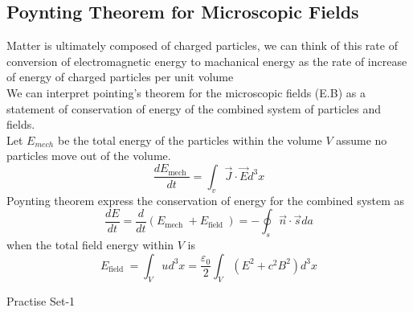 \subsection{Poynting Theorem for Microscopic Fields}
Matter is ultimately composed of charged particles, we can think of this rate of conversion of electromagnetic energy to machanical energy as the rate of increase of energy of charged particles per unit volume\\
We can interpret pointing's theorem for the microscopic fields (E.B) as a statement of conservation of energy of the combined system of particles and fields.\\
Let $E_{mech}$ be the total energy of the particles within the volume $V$ assume no particles move out of the volume.
$$\frac{d E_{\text {mech }}}{d t}=\int_{v} \vec{J} \cdot \vec{E} d^{3} x$$
Poynting theorem express the conservation of energy for the combined system as
$$\frac{d E}{d t}=\frac{d}{d t}\left(E_{\text {mech }}+E_{\text {field }}\right)=-\oint_{s} \vec{n} \cdot \vec{s} d a$$
when the total field energy within $V$ is
$$E_{\text {field } }=\int_{V} u d^{3} x=\frac{\varepsilon_{0}}{2} \int_{V}\left(E^{2}+c^{2} B^{2}\right) d^{3} x$$
\newpage
\begin{abox}
	Practise Set-1
\end{abox}
